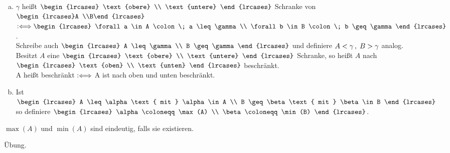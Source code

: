 \documentclass[../ana1.tex]{subfiles}
\begin{document}
\begin{defi*}\leavevmode
	\begin{enumerate}[(a)]
		\item \(\gamma \) heißt \(\begin{lrcases}
									\text{obere} \\
									\text{untere}
								 \end{lrcases} \) Schranke von \(\begin{lrcases}A \\B\end{lrcases} \)
			  \(\longeq \begin{lrcases}
							\forall a \in A \colon  \; a \leq \gamma \\
							\forall b \in B \colon  \; b \geq \gamma  
						\end{lrcases} \). \\
			  Schreibe auch \(\begin{lrcases}
								 A \leq \gamma \\ 
								 B \geq \gamma 
							  \end{lrcases} \)
			  und definiere \(A < \gamma \operatorname{,}  \; B > \gamma \) analog. \\
			  Besitzt \(A \) eine \(\begin{lrcases}
									  \text{obere} \\
									  \text{untere}
								   \end{lrcases} \) Schranke,
			  so heißt \(A \) nach \(\begin{lrcases}
									  \text{oben} \\
									  \text{unten}
								   \end{lrcases} \) beschränkt. \\
			  A heißt beschränkt \(\mathrel{\vcentcolon\Longleftrightarrow} \) A ist nach oben und unten beschränkt.
		\item Ist \(\begin{lrcases}
						A \leq \alpha \text{ mit } \alpha \in A \\
						B \geq \beta \text{ mit } \beta \in B
					\end{lrcases} \) so definiere
			  \(\begin{lrcases}
					\alpha \coloneqq \max(A) \\
					\beta \coloneqq \min(B)
				\end{lrcases} \).
	\end{enumerate}
\end{defi*}

\begin{bem}
	\(\max(A) \) und \(\min(A) \) sind eindeutig, falls sie existieren.
\end{bem}
\begin{bew}
	Übung.\phantom{\qedhere}
\end{bew}
\end{document}
